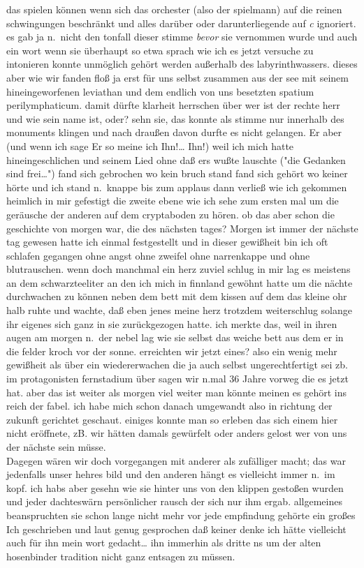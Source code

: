 \documentclass[
]{article}
\begin{document}
das spielen können wenn sich das orchester (also der spielmann) auf die
reinen schwingungen beschränkt und alles darüber oder darunterliegende
auf \emph{c} ignoriert. es gab ja n.~nicht den tonfall dieser stimme
\emph{bevor} sie vernommen wurde und auch ein wort wenn sie überhaupt so
etwa sprach wie ich es jetzt versuche zu intonieren konnte unmöglich
gehört werden außerhalb des labyrinthwassers. dieses aber wie wir fanden
floß ja erst für uns selbst zusammen aus der see mit seinem
hineingeworfenen leviathan und dem endlich von uns besetzten spatium
perilymphaticum. damit dürfte klarheit herrschen über wer ist der rechte
herr und wie sein name ist, oder? sehn sie, das konnte als stimme nur
innerhalb des monuments klingen und nach draußen davon durfte es nicht
gelangen. Er aber (und wenn ich sage Er so meine ich Ihn!\ldots{} Ihn!)
weil ich mich hatte hineingeschlichen und seinem Lied ohne daß ers wußte
lauschte ("die Gedanken sind frei\ldots") fand sich gebrochen wo kein
bruch stand fand sich gehört wo keiner hörte und ich stand n.~knappe bis
zum applaus dann verließ wie ich gekommen heimlich in mir gefestigt die
zweite ebene wie ich sehe zum ersten mal um die geräusche der anderen
auf dem cryptaboden zu hören. ob das aber schon die geschichte von
morgen war, die des nächsten tages? Morgen ist immer der nächste tag
gewesen hatte ich einmal festgestellt und in dieser gewißheit bin ich
oft schlafen gegangen ohne angst ohne zweifel ohne narrenkappe und ohne
blutrauschen. wenn doch manchmal ein herz zuviel schlug in mir lag es
meistens an dem schwarzteeliter an den ich mich in finnland gewöhnt
hatte um die nächte durchwachen zu können neben dem bett mit dem kissen
auf dem das kleine ohr halb ruhte und wachte, daß eben jenes meine herz
trotzdem weiterschlug solange ihr eigenes sich ganz in sie zurückgezogen
hatte. ich merkte das, weil in ihren augen am morgen n.~der nebel lag
wie sie selbst das weiche bett aus dem er in die felder kroch vor der
sonne. erreichten wir jetzt eines? also ein wenig mehr gewißheit als
über ein wiedererwachen die ja auch selbst ungerechtfertigt sei zb. im
protagonisten fernstadium über sagen wir n.mal 36 Jahre vorweg die es
jetzt hat. aber das ist weiter als morgen viel weiter man könnte meinen
es gehört ins reich der fabel. ich habe mich schon danach umgewandt also
in richtung der zukunft gerichtet geschaut. einiges konnte man so
erleben das sich einem hier nicht eröffnete, zB. wir hätten damals
gewürfelt oder anders gelost wer von uns der nächste sein müsse.\\
Dagegen wären wir doch vorgegangen mit anderer als zufälliger macht; das
war jedenfalls unser hehres bild und den anderen hängt es vielleicht
immer n.~im kopf. ich habs aber gesehn wie sie hinter uns von den
klippen gestoßen wurden und jeder dachteswärn persönlicher rausch der
sich nur ihm ergab. allgemeines beanspruchten sie schon lange nicht mehr
vor jede empfindung gehörte ein großes Ich geschrieben und laut genug
gesprochen daß keiner denke ich hätte vielleicht auch für ihn mein wort
gedacht\ldots{} ihn immerhin als dritte ns um der alten hosenbinder
tradition nicht ganz entsagen zu müssen.
\end{document}

